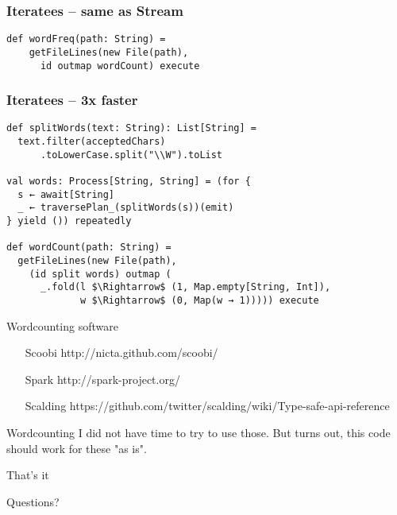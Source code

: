 \documentclass{beamer}
\begin{document}
\begin{frame}[fragile]
\frametitle{Iteratees -- same as Stream}
\begin{lstlisting}[mathescape]
  def wordFreq(path: String) =
    getFileLines(new File(path),
      id outmap wordCount) execute
\end{lstlisting}
\end{frame}

\begin{frame}[fragile]
\frametitle{Iteratees -- 3x faster}
\begin{lstlisting}[mathescape]
def splitWords(text: String): List[String] =
  text.filter(acceptedChars)
      .toLowerCase.split("\\W").toList

val words: Process[String, String] = (for {
  s ← await[String]
  _ ← traversePlan_(splitWords(s))(emit)
} yield ()) repeatedly

def wordCount(path: String) =
  getFileLines(new File(path),
    (id split words) outmap (
      _.fold(l $\Rightarrow$ (1, Map.empty[String, Int]),
             w $\Rightarrow$ (0, Map(w → 1))))) execute
\end{lstlisting}
\end{frame}

\begin{frame}{Wordcounting software}
\begin{enumerate}
  \item[Scoobi] http://nicta.github.com/scoobi/
  \item[Spark] http://spark-project.org/
  \item[Scalding] https://github.com/twitter/scalding/wiki/Type-safe-api-reference
\end{enumerate}
\end{frame}

\begin{frame}{Wordcounting}
  I did not have time to try to use those.
  But turns out, this code should work for these "as is".
\end{frame}

\begin{frame}{That's it}
  \Huge \centerline{Questions?}
\end{frame}
\end{document}
